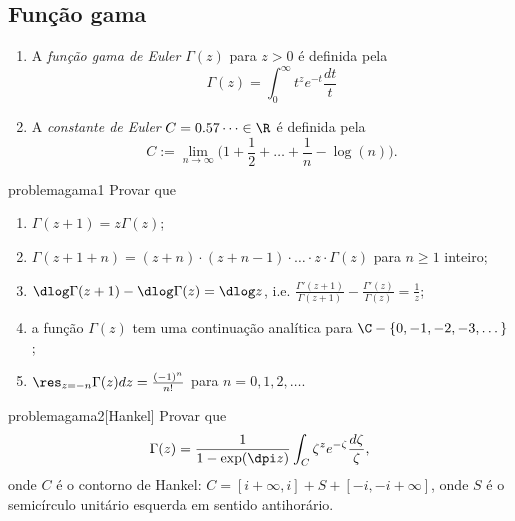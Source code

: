 \subsection{Função gama}

\begin{defin}
\begin{enumerate}
\item A \emph{função gama de Euler} $\Gamma(z)$ para $z>0$ é definida pela
\begin{equation}
\label{eq:gama}
\Gamma(z) = \int_0^\infty t^z e^{-t} \frac{dt}{t}
\end{equation}
\item A \emph{constante de Euler} $C=0.57\dots\in\R$ é definida pela
\begin{equation}
C := \lim_{n\to\infty} \big(1+\frac12+\dots+\frac{1}{n} - \log(n)\big).
\end{equation}
\end{enumerate}
\end{defin}

\begin{restatable}{problema}{gama1}\label{gama1}
Provar que
\begin{enumerate}
\item $\Gamma(z+1) = z \Gamma(z)$;
\item $\Gamma(z+1+n) = (z+n)\cdot(z+n-1)\cdot\dots\cdot z\cdot\Gamma(z)$ para $n\geq 1$ inteiro;
\item $\dlog \Gamma(z+1) - \dlog \Gamma(z) = \dlog z$,
i.e. $\frac{\Gamma'(z+1)}{\Gamma(z+1)} - \frac{\Gamma'(z)}{\Gamma(z)} = \frac{1}{z}$;
\item a função $\Gamma(z)$ tem uma continuação analítica para $\C-\{0,-1,-2,-3,\dots\}$;
\item $\res_{z=-n} \Gamma(z) dz = \frac{(-1)^n}{n!}$ para $n=0,1,2,\dots$.
\end{enumerate}
\end{restatable}

\begin{restatable}{problema}{gama2}[Hankel]\label{gama2}
Provar que
\begin{equation}
\Gamma(z) = \frac{1}{1-\exp(\dpi z)} \int_C \zeta^{z} e^{-\zeta} \frac{d\zeta}{\zeta},
\end{equation}
onde $C$ é o contorno de Hankel:
$C = [i+\infty,i] + S + [-i,-i+\infty]$, onde $S$ é o semicírculo unitário esquerda
em sentido antihorário.
\end{restatable}

